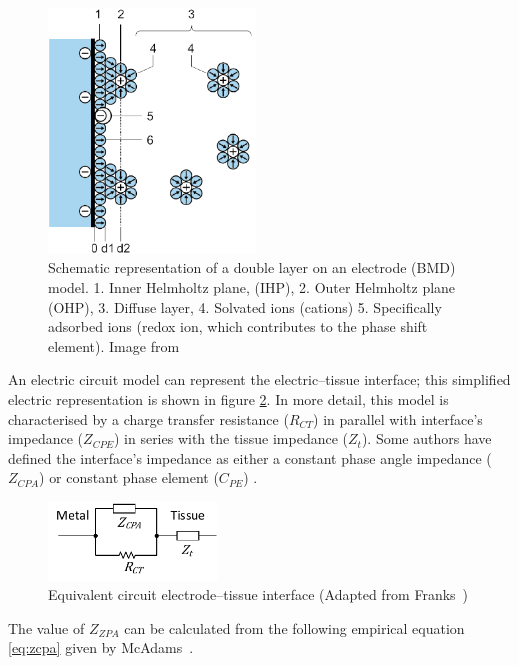 \begin{figure}[!htpb]
	\centering
	\includegraphics[width=5.5cm,keepaspectratio]{figure7}    
	\caption[Dual layer representation on an electrode]{Schematic representation of a double layer on an electrode (BMD) model. 1. Inner Helmholtz plane, (IHP), 2. Outer Helmholtz plane (OHP), 3. Diffuse layer, 4. Solvated ions (cations) 5. Specifically adsorbed ions (redox ion, which contributes to the phase shift element). Image from \cite{lvovich2012impedance}}
	\label{fig:DLC}
\end{figure}

An electric circuit model can represent the electric–tissue interface; this simplified electric representation is shown in figure \ref{fig:e-t circuit}. In more detail, this model is characterised by a charge transfer resistance ($R_{CT}$) in parallel with interface’s impedance ($Z_{CPE}$) in series with the tissue impedance ($Z_t$).  Some authors have defined the interface’s impedance as either a constant phase angle impedance ($Z_{CPA}$) \cite{franks2005impedance} or constant phase element ($C_{PE}$) \cite{barsoukov2005impedance,mcadams2006characterization}. 

\begin{figure}[!htpb]
	\centering
	\includegraphics[width=4.5cm,keepaspectratio]{figure8}    
	\caption[Equivalent circuit electrode–tissue interface]{Equivalent circuit electrode–tissue interface (Adapted from Franks~\cite{franks2005impedance})}
	\label{fig:e-t circuit}
\end{figure}

The value of $Z_{ZPA}$ can be calculated from the following empirical equation \ref{eq:zcpa} given by McAdams~\cite{mcadams1995linear}.

